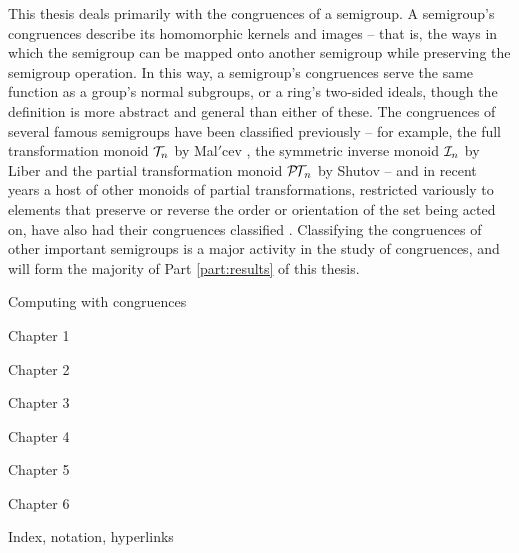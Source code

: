 This thesis deals primarily with the congruences of a semigroup.  A semigroup's
congruences describe its homomorphic kernels and images -- that is, the ways in
which the semigroup can be mapped onto another semigroup while preserving the
semigroup operation.  In this way, a semigroup's congruences serve the same
function as a group's normal subgroups, or a ring's two-sided ideals, though the
definition is more abstract and general than either of these.  The congruences
of several famous semigroups have been classified previously -- for example, the
full transformation monoid $\mathcal{T}_n$ by Mal$'$cev \cite{malcev_1952}, the symmetric
inverse monoid $\mathcal{I}_n$ by Liber \cite{liber_1953} and the partial transformation
monoid $\mathcal{P\!T\!}_n$ by Shutov \cite{shutov_1988} -- and in recent years a host of
other monoids of partial transformations, restricted variously to elements that
preserve or reverse the order or orientation of the set being acted on, have
also had their congruences classified \cite{fernandes_2000, lisbon_ii,
  lisbon_i}.  Classifying the congruences of other important semigroups is a
major activity in the study of congruences, and will form the majority of Part
\ref{part:results} of this thesis.

Computing with congruences

Chapter 1

Chapter 2

Chapter 3

Chapter 4

Chapter 5

Chapter 6

Index, notation, hyperlinks

